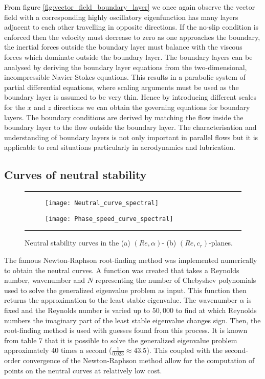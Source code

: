 \documentclass[a4paper, 12pt, twoside, openright]{article}
\numberwithin{equation}{section}
\begin{document}
From figure \ref{fig:vector_field_boundary_layer} we once again observe the vector field with a corresponding highly oscillatory eigenfunction has many layers adjacent to each other travelling in opposite directions. If the no-slip condition is enforced then the velocity must decrease to zero as one approaches the boundary, the inertial forces outside the boundary layer must balance with the viscous forces which dominate outside the boundary layer. The boundary layers can be analysed by deriving the boundary layer equations from the two-dimensional, incompressible Navier-Stokes equations. This results in a parabolic system of partial differential equations, where scaling arguments must be used as the boundary layer is assumed to be very thin. Hence by introducing different scales for the $x$ and $z$ directions we can obtain the governing equations for boundary layers. The boundary conditions are derived by matching the flow inside the boundary layer to the flow outside the boundary layer. The characterisation and understanding of boundary layers is not only important in parallel flows but it is applicable to real situations particularly in aerodynamics and lubrication. %


\subsection{Curves of neutral stability}

\begin{figure}[H]
\begin{center}
\rule{\linewidth}{1.5pt}
\end{center}
\begin{subfigure}[b]{0.5\textwidth}
\texttt{[image: Neutral\_curve\_spectral]}\hfill
\caption{\label{fig:spectral_neutral_curve}}
\end{subfigure}
\begin{subfigure}[b]{0.5\textwidth}
\texttt{[image: Phase\_speed\_curve\_spectral]}\hfill
\caption{\label{fig:wave_speed_spectral}}
\end{subfigure}
\caption{Neutral stability curves in the (a) $(Re,\alpha)$- (b) $(Re,c_r)$-planes.\label{fig:neutral_curves_spectral}}
\rule{\linewidth}{1.5pt}
\end{figure}

The famous Newton-Raphson root-finding method was implemented numerically to obtain the neutral curves. A function was created that takes a Reynolds number, wavenumber and $N$ representing the number of Chebyshev polynomials used to solve the generalized eigenvalue problem as input. This function then returns the approximation to the least stable eigenvalue. The wavenumber $\alpha$ is fixed and the Reynolds number is varied up to $50,000$ to find at which Reynolds numbers the imaginary part of the least stable eigenvalue changes sign. Then, the root-finding method is used with guesses found from this process. It is known from table 7 that it is possible to solve the generalized eigenvalue problem approximately 40 times a second ($\frac{1}{0.023}\approx 43.5$). This coupled with the second-order convergence of the Newton-Raphson method allow for the computation of points on the neutral curves at relatively low cost. %
\end{document}

